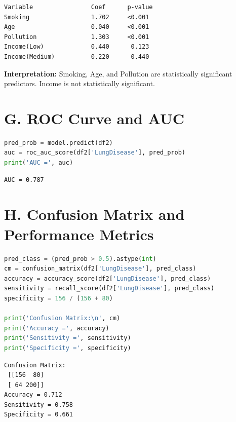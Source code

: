 \documentclass[12pt, a4paper]{article}
\begin{document}
\begin{outputbox}
\begin{verbatim}
Variable                Coef      p-value
Smoking                 1.702     <0.001
Age                     0.040     <0.001
Pollution               1.303     <0.001
Income(Low)             0.440      0.123
Income(Medium)          0.220      0.440
\end{verbatim}
\end{outputbox}

\textbf{\textcolor{RoyalNavy}{Interpretation:}} Smoking, Age, and Pollution are statistically significant predictors. Income is not statistically significant.

\section*{G. ROC Curve and AUC}

\begin{lstlisting}[language=Python]
pred_prob = model.predict(df2)
auc = roc_auc_score(df2['LungDisease'], pred_prob)
print('AUC =', auc)
\end{lstlisting}

\begin{outputbox}
\begin{verbatim}
AUC = 0.787
\end{verbatim}
\end{outputbox}

\section*{H. Confusion Matrix and Performance Metrics}

\begin{lstlisting}[language=Python]
pred_class = (pred_prob > 0.5).astype(int)
cm = confusion_matrix(df2['LungDisease'], pred_class)
accuracy = accuracy_score(df2['LungDisease'], pred_class)
sensitivity = recall_score(df2['LungDisease'], pred_class)
specificity = 156 / (156 + 80)

print('Confusion Matrix:\n', cm)
print('Accuracy =', accuracy)
print('Sensitivity =', sensitivity)
print('Specificity =', specificity)
\end{lstlisting}

\begin{outputbox}
\begin{verbatim}
Confusion Matrix:
 [[156  80]
 [ 64 200]]
Accuracy = 0.712
Sensitivity = 0.758
Specificity = 0.661
\end{verbatim}
\end{outputbox}
\end{document}
